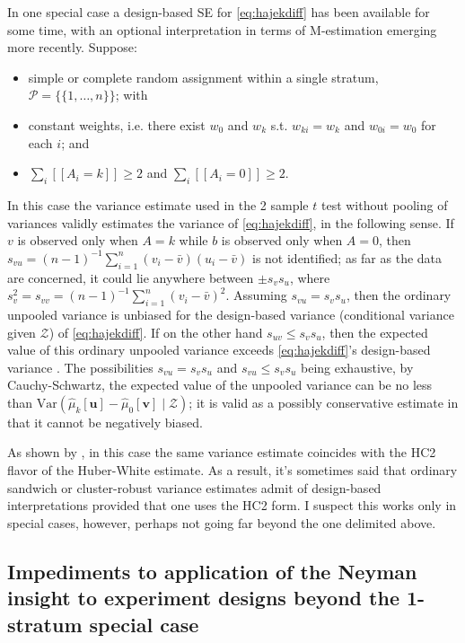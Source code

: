 In one special case a design-based SE for \eqref{eq:hajekdiff} has been available for some time, with an optional interpretation in terms of M-estimation emerging more recently.  Suppose:
\begin{itemize}
\item  simple or complete random assignment within a single
stratum, \(\mathcal{P} = \{\{1,\ldots,n\}\}\); with
\item constant weights, i.e. there exist $w_0$ and $w_k$ s.t. $w_{ki}= w_k$ and $w_{0i}= w_0$ for each $i$; and
\item  \(\sum_i [\![A_i = k]\!]\geq 2\) and \(\sum_i [\![A_i = 0]\!] \geq 2\).
\end{itemize}
In this case the variance estimate used
in the 2 sample \(t\) test without pooling of variances validly
estimates the variance of \eqref{eq:hajekdiff}, in the following sense. If \(v\) is observed
only when \(A=k\) while \(b\) is observed only when \(A=0\), then
\(s_{vu} = (n-1)^{-1} \sum_{i=1}^n (v_i - \bar v)(u_i - \bar v)\) is
not identified; as far as the data are concerned, it could lie anywhere
between \(\pm s_{v} s_{u}\), where
\(s_{v}^2 = s_{vv} = (n-1)^{-1} \sum_{i=1}^n (v_i - \bar v)^2\). Assuming
\(s_{vu} = s_{v}s_{u}\), then the ordinary unpooled variance is unbiased for
the design-based variance (conditional variance given \(\mathcal{Z}\))
of \eqref{eq:hajekdiff}. If on the other hand \(s_{uv} \leq s_{v}s_{u}\), then the expected value of this ordinary
unpooled variance exceeds \eqref{eq:hajekdiff}'s design-based variance
\citep[][A32--34]{neyman:1990,freedman:purv:pisa:1998}. The
possibilities \(s_{vu} = s_{v}s_{u}\) and \(s_{vu} \leq s_{v}s_{u}\) being
exhaustive, by Cauchy-Schwartz, the expected value of the unpooled
variance can be no less than $\mathrm{Var}(\hat{\mu}_k[\mathbf{u}] -
\hat{\mu}_0[\mathbf{v}] \mid \mathcal{Z})$; it is valid as a possibly
conservative estimate in that it cannot be negatively biased.

As shown by \citet{samiiAronow2012HC2equivNeyman}, in
this case the same variance estimate coincides with the HC2 flavor of
the Huber-White estimate.  As a result, it's sometimes said that
ordinary sandwich or cluster-robust variance estimates admit of
design-based interpretations provided that one uses the HC2
form. I suspect this works only in special cases, however, perhaps not going far
beyond the one delimited above.

\subsection*{Impediments to application of the Neyman insight to
  experiment designs beyond the 1-stratum special case}

